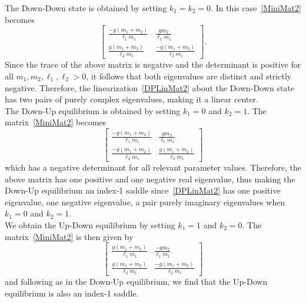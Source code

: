 \documentclass[11pt]{article}
\numberwithin{equation}{section}
\theoremstyle{plain}
\begin{document}
 The Down-Down state is obtained by setting $k_1 = k_2 = 0$. In this case~\eqref{MiniMat2} becomes
\begin{equation}
	\begin{bmatrix}
		\frac{-g(m_1 + m_2)}{\ell_1m_1} & \frac{gm_2}{\ell_1m_1} \\
		\frac{g(m_1 + m_2)}{\ell_2m_1} & \frac{-g(m_1 + m_2)}{\ell_2m_1}
	\end{bmatrix}.
\end{equation} 
Since the trace of the above matrix is negative and the determinant is positive for all $m_1,m_2,\ell_1,\ell_2 > 0$, it follows that both eigenvalues are distinct and strictly negative. Therefore, the linearization~\eqref{DPLinMat2} about the Down-Down state has two pairs of purely complex eigenvalues, making it a linear center. \\

 The Down-Up equilibrium is obtained by setting $k_1 = 0$ and $k_2 = 1$. The matrix~\eqref{MiniMat2} becomes 
\begin{equation}
	\begin{bmatrix}
		\frac{-g(m_1 + m_2)}{\ell_1m_1} & \frac{gm_2}{\ell_1m_1} \\
		\frac{-g(m_1 + m_2)}{\ell_2m_1} & \frac{g(m_1 + m_2)}{\ell_2m_1}
	\end{bmatrix}
\end{equation} 
which has a negative determinant for all relevant parameter values. Therefore, the above matrix has one positive and one negative real eigenvalue, thus making the Down-Up equilibrium an index-1 saddle since~\eqref{DPLinMat2} has one positive eigenvalue, one negative eigenvalue, a pair purely imaginary eigenvalues when $k_1 = 0$ and $k_2 = 1$.  \\

 We obtain the Up-Down equilibrium by setting $k_1 = 1$ and $k_2 = 0$. The matrix~\eqref{MiniMat2} is then given by
\begin{equation}
	\begin{bmatrix}
		\frac{g(m_1 + m_2)}{\ell_1m_1} & \frac{-gm_2}{\ell_1m_1} \\
		\frac{g(m_1 + m_2)}{\ell_2m_1} & \frac{-g(m_1 + m_2)}{\ell_2m_1}
	\end{bmatrix}
\end{equation} 
and following as in the Down-Up equilibrium, we find that the Up-Down equilibrium is also an index-1 saddle. \\
\end{document}
